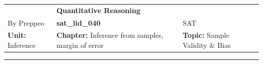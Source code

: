 \documentclass[11pt,paper=a4,answers]{exam}
\begin{document}
\begin{center}
    \centering
    \renewcommand{\arraystretch}{1.5}
    \begin{tabularx}{\textwidth}{YYY}
    & \normalsize\bf{{\Large{{Quantitative Reasoning}}}} & \\
    By Preppeo & \normalsize\bf{{sat\_lid\_040}} & SAT\\
    \normalsize{{\textbf{{Unit:}} Inference}} & \normalsize{{\textbf{{Chapter:}} Inference from samples, margin of error}} & \normalsize{{\textbf{{Topic:}} Sample Validity \& Bias}} \\
    \end{tabularx}
\end{center}
\par\noindent\rule{\textwidth}{1pt}
\end{document}
